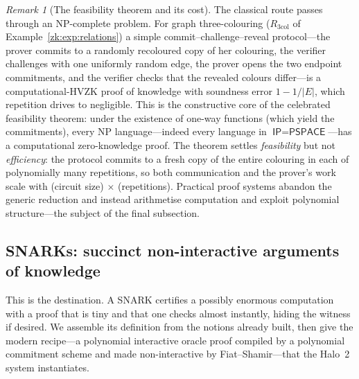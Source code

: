\documentclass[11pt,a4paper]{article}
\theoremstyle{definition}
\theoremstyle{remark}
\newtheorem{remark}[theorem]{Remark}
\begin{document}
\begin{remark}[The feasibility theorem and its cost]\label{zk:rem:feasibility}
The classical route passes through an \textsf{NP}-complete problem. For graph three-colouring (\(R_{\mathrm{3col}}\) of Example~\ref{zk:exp:relations}) a simple commit--challenge--reveal protocol---the prover commits to a randomly recoloured copy of her colouring, the verifier challenges with one uniformly random edge, the prover opens the two endpoint commitments, and the verifier checks that the revealed colours differ---is a computational-HVZK proof of knowledge with soundness error \(1 - 1/|E|\), which repetition drives to negligible. This is the constructive core of the celebrated feasibility theorem: under the existence of one-way functions (which yield the commitments), every \textsf{NP} language---indeed every language in \(\textsf{IP} = \textsf{PSPACE}\)---has a computational zero-knowledge proof. The theorem settles \emph{feasibility} but not \emph{efficiency}: the protocol commits to a fresh copy of the entire colouring in each of polynomially many repetitions, so both communication and the prover's work scale with (circuit size) \(\times\) (repetitions). Practical proof systems abandon the generic reduction and instead arithmetise computation and exploit polynomial structure---the subject of the final subsection.
\end{remark}

\subsection{SNARKs: succinct non-interactive arguments of knowledge}\label{zk:subsec:snark}

This is the destination. A SNARK certifies a possibly enormous computation with a proof that is tiny and that one checks almost instantly, hiding the witness if desired. We assemble its definition from the notions already built, then give the modern recipe---a polynomial interactive oracle proof compiled by a polynomial commitment scheme and made non-interactive by Fiat--Shamir---that the Halo~2 system instantiates.
\end{document}
